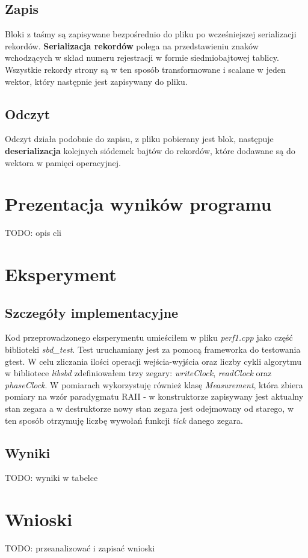 \documentclass{article}
\begin{document}
\subsection{Zapis}
Bloki z taśmy są zapisywane bezpośrednio do pliku po wcześniejszej serializacji rekordów. \textbf{Serializacja rekordów} polega na przedstawieniu 
znaków wchodzących w skład numeru rejestracji w formie siedmiobajtowej tablicy. Wszystkie rekordy strony są w ten sposób transformowane i 
scalane w jeden wektor, który następnie jest zapisywany do pliku. 
\subsection{Odczyt}
Odczyt działa podobnie do zapisu, z pliku pobierany jest blok, następuje \textbf{deserializacja} kolejnych siódemek bajtów do rekordów, które dodawane są do wektora w pamięci operacyjnej.
\section{Prezentacja wyników programu}
TODO: opis cli
\section{Eksperyment}
\subsection{Szczegóły implementacyjne}
Kod przeprowadzonego eksperymentu umieściłem w pliku \textit{perf1.cpp} jako część biblioteki \textit{sbd\_test}. Test uruchamiany jest za pomocą frameworka do
testowania gtest. W celu zliczania ilości operacji wejścia-wyjścia oraz liczby cykli algorytmu w bibliotece \textit{libsbd} zdefiniowałem trzy zegary: 
\textit{writeClock}, \textit{readClock} oraz \textit{phaseClock}. W pomiarach wykorzystuję również klasę \textit{Measurement}, która zbiera pomiary na wzór paradygmatu RAII - w 
konstruktorze zapisywany jest aktualny stan zegara a w destruktorze nowy stan zegara jest odejmowany od starego, w ten sposób otrzymuję liczbę
wywołań funkcji \textit{tick} danego zegara.
\subsection{Wyniki}
TODO: wyniki w tabelce
\section{Wnioski}
TODO: przeanalizować i zapisać wnioski
\end{document}
